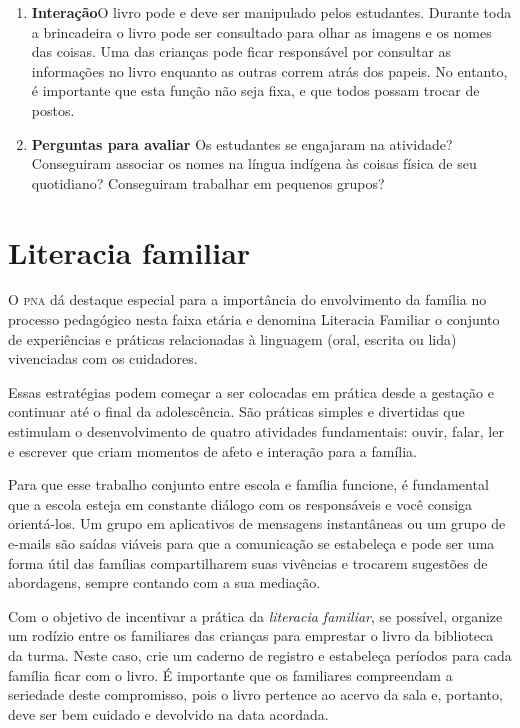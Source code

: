 \documentclass[11pt]{extarticle}
\begin{document}
{{\begin{enumerate}
\begin{itemize}
\item É o lugar onde os Awá-Guajá descansam!
\item É o lugar onde os Awá-Guajá se reunem para estudar!
\end{itemize}

\item \textbf{Interação}\quad O livro pode e deve ser 
manipulado pelos estudantes. Durante toda a brincadeira 
o livro pode ser consultado para olhar as imagens e os 
nomes das coisas. Uma das crianças pode ficar responsável
por consultar as informações no livro enquanto as outras correm
atrás dos papeis. No entanto, é importante que esta função não
seja fixa, e que todos possam trocar de postos.


\item \textbf{Perguntas para avaliar}\quad
Os estudantes se engajaram na atividade? Conseguiram associar os nomes na
língua indígena às coisas física de seu quotidiano?
Conseguiram trabalhar em pequenos grupos? 

\end{enumerate}

\section{Literacia familiar}
O \textsc{pna} dá destaque especial para a importância do envolvimento da família 
no processo pedagógico nesta faixa etária e denomina Literacia Familiar o conjunto 
de experiências e práticas relacionadas à linguagem (oral, escrita ou lida) vivenciadas 
com os cuidadores. 

Essas estratégias podem começar a ser colocadas em prática desde a 
gestação e continuar até o final da adolescência. São práticas simples e divertidas 
que estimulam o desenvolvimento de quatro atividades fundamentais: ouvir, falar, 
ler e escrever que criam momentos de afeto e interação para a família. 

Para que esse trabalho conjunto entre escola e família funcione, é 
fundamental que a escola esteja em constante diálogo com os responsáveis e 
você consiga orientá-los. Um grupo em aplicativos de mensagens instantâneas ou um 
grupo de e-mails são saídas viáveis para que a comunicação se estabeleça e pode ser 
uma forma útil das famílias compartilharem suas vivências e trocarem sugestões 
de abordagens, sempre contando com a sua mediação. 

Com o objetivo de incentivar 
a prática da \textit{literacia familiar}, se possível, organize um rodízio entre os familiares 
das crianças para emprestar o livro da biblioteca da turma. Neste caso, crie um caderno 
de registro e estabeleça períodos para cada família ficar com o livro. É importante 
que os familiares compreendam a seriedade deste compromisso, pois o livro pertence 
ao acervo da sala e, portanto, deve ser bem cuidado e devolvido na data acordada. 

}}
\end{document}
